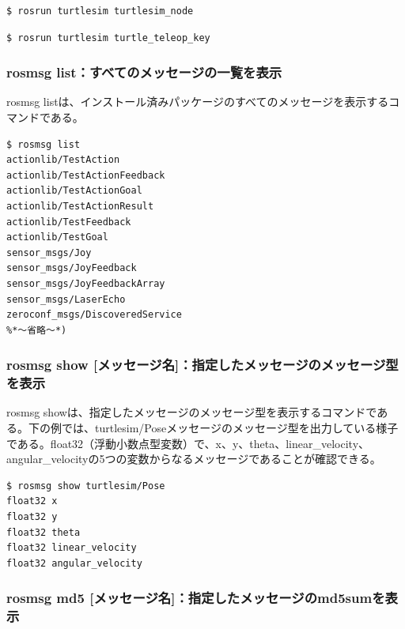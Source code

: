 \begin{lstlisting}[language=ROS]
$ rosrun turtlesim turtlesim_node
\end{lstlisting}

\begin{lstlisting}[language=ROS]
$ rosrun turtlesim turtle_teleop_key
\end{lstlisting}

\subsubsection{rosmsg list：すべてのメッセージの一覧を表示}

rosmsg listは、インストール済みパッケージのすべてのメッセージを表示するコマンドである。

\begin{lstlisting}[language=ROS]
$ rosmsg list
actionlib/TestAction
actionlib/TestActionFeedback
actionlib/TestActionGoal
actionlib/TestActionResult
actionlib/TestFeedback
actionlib/TestGoal
sensor_msgs/Joy
sensor_msgs/JoyFeedback
sensor_msgs/JoyFeedbackArray
sensor_msgs/LaserEcho
zeroconf_msgs/DiscoveredService
%*〜省略〜*)
\end{lstlisting}

\subsubsection{rosmsg show [メッセージ名]：指定したメッセージのメッセージ型を表示}

rosmsg showは、指定したメッセージのメッセージ型を表示するコマンドである。下の例では、turtlesim/Poseメッセージのメッセージ型を出力している様子である。float32（浮動小数点型変数）で、x、y、theta、linear\_velocity、angular\_velocityの5つの変数からなるメッセージであることが確認できる。

\begin{lstlisting}[language=ROS]
$ rosmsg show turtlesim/Pose
float32 x
float32 y
float32 theta
float32 linear_velocity
float32 angular_velocity
\end{lstlisting}

\subsubsection{rosmsg md5 [メッセージ名]：指定したメッセージのmd5sumを表示}

